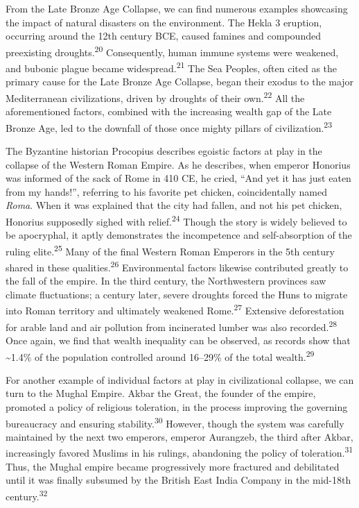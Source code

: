 \documentclass[12pt]{article}
\begin{document}
From the Late Bronze Age Collapse, we can find numerous examples showcasing the impact of natural disasters on the environment. The Hekla 3 eruption, occurring around the 12th century BCE, caused famines and compounded preexisting droughts.\textsuperscript{20} Consequently, human immune systems were weakened, and bubonic plague became widespread.\textsuperscript{21} The Sea Peoples, often cited as the primary cause for the Late Bronze Age Collapse, began their exodus to the major Mediterranean civilizations, driven by droughts of their own.\textsuperscript{22} All the aforementioned factors, combined with the increasing wealth gap of the Late Bronze Age, led to the downfall of those once mighty pillars of civilization.\textsuperscript{23}

The Byzantine historian Procopius describes egoistic factors at play in the collapse of the Western Roman Empire. As he describes, when emperor Honorius was informed of the sack of Rome in 410 CE, he cried, ``And yet it has just eaten from my hands!'', referring to his favorite pet chicken, coincidentally named \textit{Roma}. When it was explained that the city had fallen, and not his pet chicken, Honorius supposedly sighed with relief.\textsuperscript{24} Though the story is widely believed to be apocryphal, it aptly demonstrates the incompetence and self-absorption of the ruling elite.\textsuperscript{25} Many of the final Western Roman Emperors in the 5th century shared in these qualities.\textsuperscript{26} Environmental factors likewise contributed greatly to the fall of the empire. In the third century, the Northwestern provinces saw climate fluctuations; a century later, severe droughts forced the Huns to migrate into Roman territory and ultimately weakened Rome.\textsuperscript{27} Extensive deforestation for arable land and air pollution from incinerated lumber was also recorded.\textsuperscript{28} Once again, we find that wealth inequality can be observed, as records show that \textasciitilde1.4\% of the population controlled around 16--29\% of the total wealth.\textsuperscript{29}

For another example of individual factors at play in civilizational collapse, we can turn to the Mughal Empire. Akbar the Great, the founder of the empire, promoted a policy of religious toleration, in the process improving the governing bureaucracy and ensuring stability.\textsuperscript{30} However, though the system was carefully maintained by the next two emperors, emperor Aurangzeb, the third after Akbar, increasingly favored Muslims in his rulings, abandoning the policy of toleration.\textsuperscript{31} Thus, the Mughal empire became progressively more fractured and debilitated until it was finally subsumed by the British East India Company in the mid-18th century.\textsuperscript{32}
\end{document}
